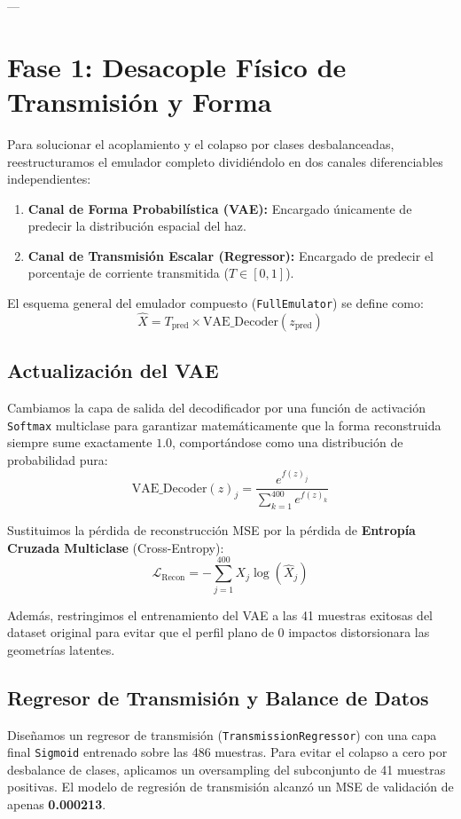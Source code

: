 \documentclass[11pt,spanish]{article}
\begin{document}
---

\section{Fase 1: Desacople Físico de Transmisión y Forma}
Para solucionar el acoplamiento y el colapso por clases desbalanceadas, reestructuramos el emulador completo dividiéndolo en dos canales diferenciables independientes:
\begin{enumerate}
    \item \textbf{Canal de Forma Probabilística (VAE):} Encargado únicamente de predecir la distribución espacial del haz.
    \item \textbf{Canal de Transmisión Escalar (Regressor):} Encargado de predecir el porcentaje de corriente transmitida ($T \in [0, 1]$).
\end{enumerate}

El esquema general del emulador compuesto (\texttt{FullEmulator}) se define como:
\begin{equation}
\hat{X} = T_{\text{pred}} \times \text{VAE\_Decoder}(z_{\text{pred}})
\end{equation}

\subsection{Actualización del VAE}
Cambiamos la capa de salida del decodificador por una función de activación \texttt{Softmax} multiclase para garantizar matemáticamente que la forma reconstruida siempre sume exactamente $1.0$, comportándose como una distribución de probabilidad pura:
\begin{equation}
\text{VAE\_Decoder}(z)_j = \frac{e^{f(z)_j}}{\sum_{k=1}^{400} e^{f(z)_k}}
\end{equation}

Sustituimos la pérdida de reconstrucción MSE por la pérdida de \textbf{Entropía Cruzada Multiclase} (Cross-Entropy):
\begin{equation}
\mathcal{L}_{\text{Recon}} = -\sum_{j=1}^{400} X_j \log(\hat{X}_j)
\end{equation}

Además, restringimos el entrenamiento del VAE a las 41 muestras exitosas del dataset original para evitar que el perfil plano de 0 impactos distorsionara las geometrías latentes.

\subsection{Regresor de Transmisión y Balance de Datos}
Diseñamos un regresor de transmisión (\texttt{TransmissionRegressor}) con una capa final \texttt{Sigmoid} entrenado sobre las 486 muestras. Para evitar el colapso a cero por desbalance de clases, aplicamos un oversampling del subconjunto de 41 muestras positivas. El modelo de regresión de transmisión alcanzó un MSE de validación de apenas \textbf{0.000213}.
\end{document}
